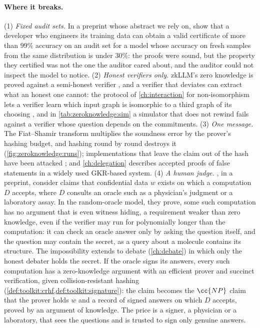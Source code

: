 \begin{refsection}
\paragraph{Where it breaks.} (1) \emph{Fixed audit sets.} In a preprint whose abstract we rely on, \textcite{LuckEtAl2026} show that a developer who engineers its training data can obtain a valid certificate of more than $99\%$ accuracy on an audit set for a model whose accuracy on fresh samples from the same distribution is under $30\%$: the proofs were sound, but the property they certified was not the one the auditor cared about, and the auditor could not inspect the model to notice. (2) \emph{Honest verifiers only.} zkLLM's zero knowledge is proved against a semi-honest verifier \parencite{SunLiZhang2024}, and a verifier that deviates can extract what an honest one cannot: the protocol of \cref{ch:interaction} for non-isomorphism lets a verifier learn which input graph is isomorphic to a third graph of its choosing \parencite[Section~2.3]{GoldreichMicaliWigderson1991}, and in \cref{tab:zeroknowledge:sim} a simulator that does not rewind fails against a verifier whose question depends on the commitments. (3) \emph{One message.} The Fiat--Shamir transform multiplies the soundness error by the prover's hashing budget, and hashing round by round destroys it (\cref{fig:zeroknowledge:runs}); implementations that leave the claim out of the hash have been attacked \parencite[Section~5.2]{Thaler2022}; and \cref{ch:delegation} describes accepted proofs of false statements in a widely used GKR-based system. (4) \emph{A human judge.} \Textcite{ChiesaGuanYildiz2026}, in a preprint, consider claims that confidential data $w$ exists on which a computation $D$ accepts, where $D$ consults an oracle such as a physician's judgment or a laboratory assay. In the random-oracle model, they prove, some such computation has no argument that is even witness hiding, a requirement weaker than zero knowledge, even if the verifier may run for polynomially longer than the computation: it can check an oracle answer only by asking the question itself, and the question may contain the secret, as a query about a molecule contains its structure. The impossibility extends to debate (\cref{ch:debate}) in which only the honest debater holds the secret. If the oracle signs its answers, every such computation has a zero-knowledge argument with an efficient prover and succinct verification, given collision-resistant hashing (\cref{def:toolkit:crhf,def:toolkit:signature}): the claim becomes the $\cc{NP}$ claim that the prover holds $w$ and a record of signed answers on which $D$ accepts, proved by an argument of knowledge. The price is a signer, a physician or a laboratory, that sees the questions and is trusted to sign only genuine answers.


\end{refsection}
